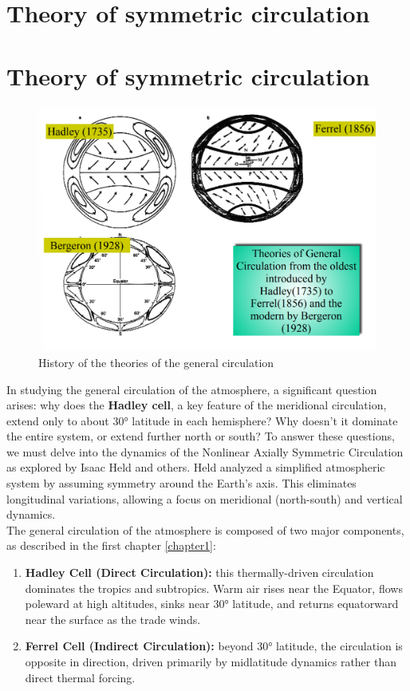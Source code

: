 \chapter{Theory of symmetric circulation}%

\chapter{Theory of symmetric circulation}
\begin{figure}[htpb]
	\centering
	\includegraphics[width=0.35\linewidth]{uploads/Screenshot 2024-12-07 124123.png}
	\caption{History of the theories of the general circulation}
	\label{fig:enter-label}
\end{figure}
In studying the general circulation of the atmosphere, a significant question arises: why does the \textbf{Hadley cell}, a key feature of the meridional circulation, extend only to about 30° latitude in each hemisphere? Why doesn’t it dominate the entire system, or extend further north or south? To answer these questions, we must delve into the dynamics of the Nonlinear Axially Symmetric Circulation\cite{Held} as explored by Isaac Held and others. Held analyzed a simplified atmospheric system by assuming symmetry around the Earth's axis. This eliminates longitudinal variations, allowing a focus on meridional (north-south) and vertical dynamics.\\


The general circulation of the atmosphere is composed of two major components, as described in the first chapter \ref{chapter1}:

\begin{enumerate}
	\item \textbf{Hadley Cell (Direct Circulation):} this thermally-driven circulation dominates the tropics and subtropics. Warm air rises near the Equator, flows poleward at high altitudes, sinks near 30° latitude, and returns equatorward near the surface as the trade winds.
	\item \textbf{Ferrel Cell (Indirect Circulation):} beyond 30° latitude, the circulation is opposite in direction, driven primarily by midlatitude dynamics rather than direct thermal forcing.
\end{enumerate}

